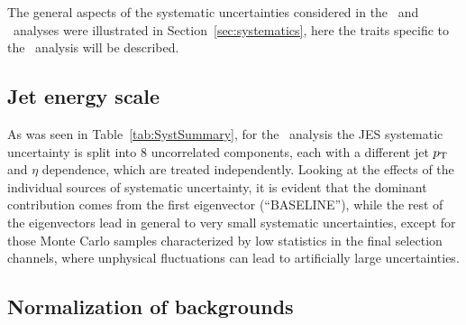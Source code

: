 The general aspects of the systematic uncertainties considered
in the \wbx\ and \htx\ analyses were illustrated
in Section~\ref{sec:systematics}, here the traits specific to the
\htx\ analysis will be described.


\subsection{Jet energy scale}\label{sec:htx_syst_jes}
As was seen in Table~\ref{tab:SystSummary}, for the \htx\ analysis
the JES systematic uncertainty is split into 8
uncorrelated components, each with a different jet $\pt$ and $\eta$
dependence, which are treated independently.
Looking at the effects of the individual sources of systematic uncertainty, 
it is evident that the dominant contribution comes from the first 
eigenvector (``BASELINE''), while the rest of the
eigenvectors lead in general to very small systematic uncertainties, 
except for those Monte Carlo samples characterized by low statistics
in the final selection channels, where unphysical fluctuations
can lead to artificially large uncertainties. 

\subsection{Normalization of backgrounds}\label{sec:syst_normHTX}

